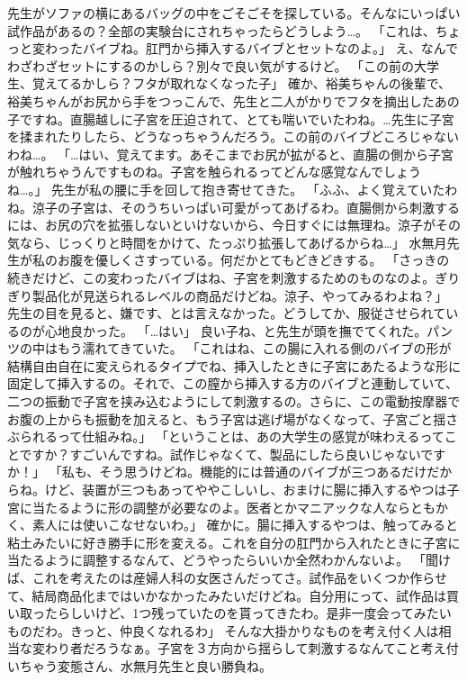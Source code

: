先生がソファの横にあるバッグの中をごそごそを探している。そんなにいっぱい試作品があるの？全部の実験台にされちゃったらどうしよう…。
「これは、ちょっと変わったバイブね。肛門から挿入するバイブとセットなのよ。」
え、なんでわざわざセットにするのかしら？別々で良い気がするけど。
「この前の大学生、覚えてるかしら？フタが取れなくなった子」
確か、裕美ちゃんの後輩で、裕美ちゃんがお尻から手をつっこんで、先生と二人がかりでフタを摘出したあの子ですね。直腸越しに子宮を圧迫されて、とても喘いでいたわね。…先生に子宮を揉まれたりしたら、どうなっちゃうんだろう。この前のバイブどころじゃないわね…。
「…はい、覚えてます。あそこまでお尻が拡がると、直腸の側から子宮が触れちゃうんですものね。子宮を触られるってどんな感覚なんでしょうね…。」
先生が私の腰に手を回して抱き寄せてきた。
「ふふ、よく覚えていたわね。涼子の子宮は、そのうちいっぱい可愛がってあげるわ。直腸側から刺激するには、お尻の穴を拡張しないといけないから、今日すぐには無理ね。涼子がその気なら、じっくりと時間をかけて、たっぷり拡張してあげるからね…」
水無月先生が私のお腹を優しくさすっている。何だかとてもどきどきする。
「さっきの続きだけど、この変わったバイブはね、子宮を刺激するためのものなのよ。ぎりぎり製品化が見送られるレベルの商品だけどね。涼子、やってみるわよね？」
先生の目を見ると、嫌です、とは言えなかった。どうしてか、服従させられているのが心地良かった。
「…はい」
良い子ね、と先生が頭を撫でてくれた。パンツの中はもう濡れてきていた。
「これはね、この腸に入れる側のバイブの形が結構自由自在に変えられるタイプでね、挿入したときに子宮にあたるような形に固定して挿入するの。それで、この膣から挿入する方のバイブと連動していて、二つの振動で子宮を挟み込むようにして刺激するの。さらに、この電動按摩器でお腹の上からも振動を加えると、もう子宮は逃げ場がなくなって、子宮ごと揺さぶられるって仕組みね。」
「ということは、あの大学生の感覚が味わえるってことですか？すごいんですね。試作じゃなくて、製品にしたら良いじゃないですか！」
「私も、そう思うけどね。機能的には普通のバイブが三つあるだけだからね。けど、装置が三つもあってややこしいし、おまけに腸に挿入するやつは子宮に当たるように形の調整が必要なのよ。医者とかマニアックな人ならともかく、素人には使いこなせないわ。」
確かに。腸に挿入するやつは、触ってみると粘土みたいに好き勝手に形を変える。これを自分の肛門から入れたときに子宮に当たるように調整するなんて、どうやったらいいか全然わかんないよ。
「聞けば、これを考えたのは産婦人科の女医さんだってさ。試作品をいくつか作らせて、結局商品化まではいかなかったみたいだけどね。自分用にって、試作品は買い取ったらしいけど、1つ残っていたのを貰ってきたわ。是非一度会ってみたいものだわ。きっと、仲良くなれるわ」
そんな大掛かりなものを考え付く人は相当な変わり者だろうなぁ。子宮を３方向から揺らして刺激するなんてこと考え付いちゃう変態さん、水無月先生と良い勝負ね。
